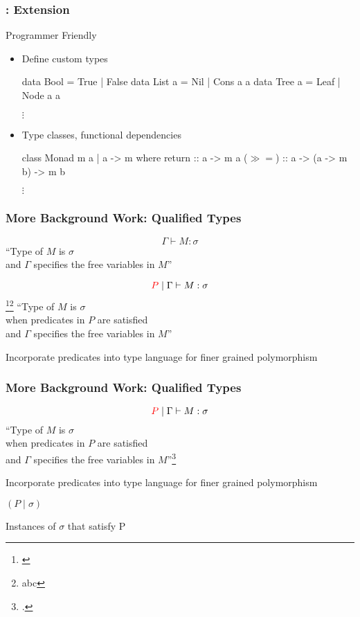 \begin{frame}[c, fragile]
  \frametitle{\qub{}: Extension}
  \begin{center}
   {\LARGE Programmer Friendly}
   \begin{itemize}
   \item<1-> Define custom types

   \begin{haskell}
                  data Bool   = True | False
                  data List a = Nil  | Cons a a
                  data Tree a = Leaf | Node a a

                               $\vdots$
   \end{haskell}

   \item<2-> Type classes, functional dependencies

    \begin{haskell}
                  class Monad m a | a -> m where
                      return :: a -> m a
                      ($\gg\!=$)  :: a -> (a -> m b) -> m b

                           $\vdots$
   \end{haskell}
 \end{itemize}

 \end{center}
\end{frame}


\begin{frame}[c]
  \frametitle{More Background Work: Qualified Types}
  \begin{center}
    {\LARGE   $$\Gamma \vdash M:\sigma $$}
``Type of $M$ is $\sigma$\\
  and $\Gamma$ specifies the free variables in $M$''

  {\LARGE   $${\color{red}P} \mid \Gamma \vdash M:\sigma $$}\footnote{\cite{jones_theory_1994}}\footnote{abc}
``Type of $M$ is $\sigma$\\
  when predicates in $P$ are satisfied\\
  and $\Gamma$ specifies the free variables in $M$''

  Incorporate predicates into type language for finer grained polymorphism
  \end{center}
\end{frame}

\begin{frame}[c]
  \frametitle{More Background Work: Qualified Types}
  \begin{center}
  {\LARGE   $${\color{red}P} \mid \Gamma \vdash M:\sigma $$}
``Type of $M$ is $\sigma$\\
  when predicates in $P$ are satisfied\\
  and $\Gamma$ specifies the free variables in $M$''\footcite{jones_theory_1994}

  Incorporate predicates into type language for finer grained polymorphism


  {\LARGE $(P \mid \sigma)$}

  Instances of $\sigma$ that satisfy P
  \end{center}
\end{frame}

